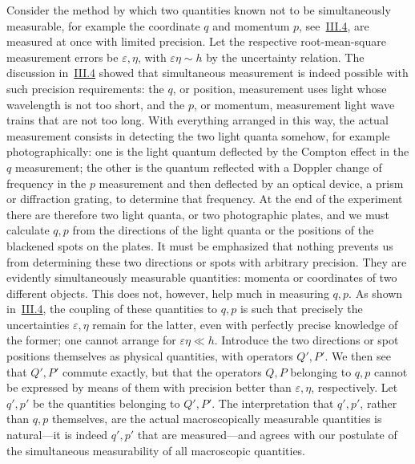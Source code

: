 \documentclass[fontsize=13pt,twoside,openany,headings=normal,parskip=false,bookmarkpackage=false,DIV=calc]{scrbook}
\begin{document}
Consider the method by which two quantities known not to be simultaneously measurable, for example the coordinate $q$ and momentum $p$, see~\hyperref[sec:III.4]{III.4}, are measured at once with limited precision. Let the respective root-mean-square measurement errors be $\varepsilon,\eta$, with $\varepsilon\eta\sim h$ by the uncertainty relation. The discussion in~\hyperref[sec:III.4]{III.4} showed that simultaneous measurement is indeed possible with such precision requirements: the $q$, or position, measurement uses light whose wavelength is not too short, and the $p$, or momentum, measurement light wave trains that are not too long. With everything arranged in this way, the actual measurement consists in detecting the two light quanta somehow, for example photographically:
\hypertarget{origpage-215}{}%
one is the light quantum deflected by the Compton effect in the $q$ measurement; the other is the quantum reflected with a Doppler change of frequency in the $p$ measurement and then deflected by an optical device, a prism or diffraction grating, to determine that frequency. At the end of the experiment there are therefore two light quanta, or two photographic plates, and we must calculate $q,p$ from the directions of the light quanta or the positions of the blackened spots on the plates. It must be emphasized that nothing prevents us from determining these two directions or spots with arbitrary precision. They are evidently simultaneously measurable quantities: momenta or coordinates of two different objects. This does not, however, help much in measuring $q,p$. As shown in~\hyperref[sec:III.4]{III.4}, the coupling of these quantities to $q,p$ is such that precisely the uncertainties $\varepsilon,\eta$ remain for the latter, even with perfectly precise knowledge of the former; one cannot arrange for $\varepsilon\eta\ll h$. Introduce the two directions or spot positions themselves as physical quantities, with operators $Q',P'$. We then see that $Q',P'$ commute exactly, but that the operators $Q,P$ belonging to $q,p$ cannot be expressed by means of them with precision better than $\varepsilon,\eta$, respectively. Let $q',p'$ be the quantities belonging to $Q',P'$. The interpretation that $q',p'$, rather than $q,p$ themselves, are the actual macroscopically measurable quantities is natural---it is indeed $q',p'$ that are measured---and agrees with our postulate of the simultaneous measurability of all macroscopic quantities.
\end{document}
